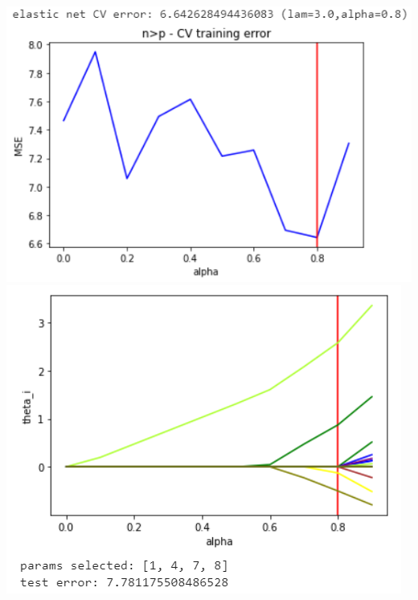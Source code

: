 \documentclass[11pt]{article}
\begin{document}
\begin{center}
\includegraphics[scale=0.7]{charts/en_ortho_n_gt_p_err.PNG}
\includegraphics[scale=0.7]{charts/en_ortho_n_gt_p_thetas.PNG}


\end{center}
\end{document}
